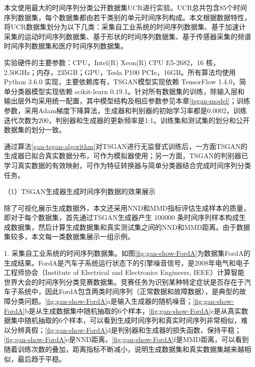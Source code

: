 本文使用最大的时间序列分类公开数据集UCR\cite{bagnall16bakeoff}进行实验。UCR总共包含85个时间序列数据集，每个数据集都由若干类别的单元时间序列构成。本文根据数据特性，将UCR数据集划分为以下几类：采集自工业系统的时间序列数据集、基于加速计采集的运动时间序列数据集、基于形状的时间序列数据集、基于传感器采集的频谱时间序列数据集和医疗时间序列数据集。

实验硬件的主要参数：CPU，Intel(R) Xeon(R) CPU E5-2682，16 核，2.50GHz；内存，235GB；GPU，Tesla P100 PCIe，16GB。所有算法均使用 Python 3.6.0 实现，主要依赖库有，TSGAN模型实现依赖 TensorFlow 1.4.0，简单分类器模型实现依赖 scikit-learn 0.19.1。针对所有数据集的训练，除输入层和输出层外均采用统一配置，其中模型结构及相应参数参见本章\ref{tsgan-model}；训练参数，采用Adam梯度下降算法，生成器和判别器的初始学习率都是0.0002，训练迭代次数为200，判别器和生成器的更新频率是1:1。训练集和测试集的划分和公开数据集的划分一致。

通过算法\ref{gan-tsgan-algorithm}对TSGAN进行无监督式训练后，一方面TSGAN的生成器已拟合真实数据分布，可作为模拟器使用；另一方面，TSGAN的判别器已学习真实数据的有效映射，可作为特征转换器与简单分类器结合完成时间序列分类任务。

（1）TSGAN生成器生成时间序列数据的效果展示

除了可视化展示生成数据外，本文还采用NND和MMD指标评估生成样本的质量，即对于每个数据集，首先通过TSGAN生成器产生 100000 条时间序列样本构成生成数据集，然后计算生成数据集和真实测试集之间的NND和MMD距离。由于数据集较多，本文每一类数据集展示一组示例。

1. 采集自工业系统的时间序列数据集。如图\ref{fig:gan-show-FordA}为数据集FordA的生成结果。FordA是汽车子系统运行状态下的引擎噪音信号，是2008年电气和电子工程师协会（Institute of Electrical and Electronics Engineers, IEEE）计算智能世界大会的时间序列分类竞赛数据集。竞赛任务为识别某种特定症状是否存在于汽车子系统中，因此FordA包含两类时间序列（正常数据和故障数据），是典型的故障分类问题。\ref{fig:gan-show-FordA}a是输入生成器的随机噪音；\ref{fig:gan-show-FordA}b是从生成数据集中随机抽取的6个样本，\ref{fig:gan-show-FordA}c是从真实数据集中随机抽取的6个样本，可以看到生成时间序列和真实时间序列非常相似，难以分辨真假；\ref{fig:gan-show-FordA}d是判别器和生成器的损失函数，保持平稳；\ref{fig:gan-show-FordA}e是NND距离，\ref{fig:gan-show-FordA}f是MMD距离，可以看到随着训练次数的叠加，距离指标不断减小，说明生成数据集和真实数据集越来越相似，最后趋于平稳。 

